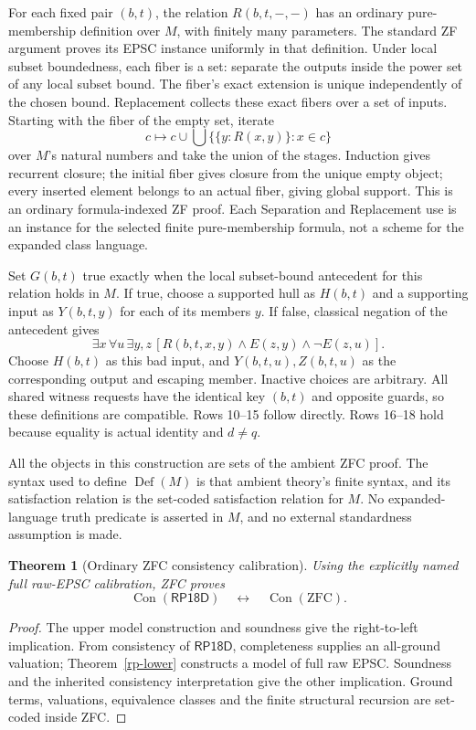 \documentclass[11pt]{article}
\newtheorem{theorem}{Theorem}[section]
\newcommand{\Con}{\operatorname{Con}}
\newcommand{\RP}{\mathsf{RP18D}}
\begin{document}
For each fixed pair $(b,t)$, the relation $R(b,t,-,-)$ has an ordinary
pure-membership definition over $M$, with finitely many parameters.
The standard ZF argument proves its EPSC instance uniformly in that
definition. Under local subset boundedness, each fiber is a set:
separate the outputs inside the power set of any local subset bound.
The fiber's exact extension is unique independently of the chosen bound.
Replacement collects these exact fibers over a set of inputs. Starting
with the fiber of the empty set, iterate
\[
 c\longmapsto c\cup\bigcup\{\{y:R(x,y)\}:x\in c\}
\]
over $M$'s natural numbers and take the union of the stages. Induction
gives recurrent closure; the initial fiber gives closure from the unique
empty object; every inserted element belongs to an actual fiber, giving
global support. This is an ordinary formula-indexed ZF proof. Each
Separation and Replacement use is an instance for the selected finite
pure-membership formula, not a scheme for the expanded class language.

Set $G(b,t)$ true exactly when the local subset-bound antecedent for
this relation holds in $M$. If true, choose a supported hull as $H(b,t)$
and a supporting input as $Y(b,t,y)$ for each of its members $y$.
If false, classical negation of the antecedent gives
\[
 \exists x\,\forall u\,\exists y,z\,
       [R(b,t,x,y)\land E(z,y)\land\neg E(z,u)].
\]
Choose $H(b,t)$ as this bad input, and $Y(b,t,u),Z(b,t,u)$ as the
corresponding output and escaping member. Inactive choices are arbitrary.
All shared witness requests have the identical key $(b,t)$ and opposite
guards, so these definitions are compatible. Rows 10--15 follow directly.
Rows 16--18 hold because equality is actual identity and $d\ne q$.

All the objects in this construction are sets of the ambient ZFC proof.
The syntax used to define $\operatorname{Def}(M)$ is that ambient
theory's finite syntax, and its satisfaction relation is the set-coded
satisfaction relation for $M$. No expanded-language truth predicate is
asserted in $M$, and no external standardness assumption is made.

\begin{theorem}[Ordinary ZFC consistency calibration]\label{rp-main}
Using the explicitly named full raw-EPSC calibration, ZFC proves
\[
 \Con(\RP)\quad\longleftrightarrow\quad\Con(\mathrm{ZFC}).
\]
\end{theorem}
\begin{proof}
The upper model construction and soundness give the right-to-left
implication. From consistency of $\RP$, completeness supplies an
all-ground valuation; Theorem~\ref{rp-lower} constructs a model of
full raw EPSC. Soundness and the inherited consistency interpretation
give the other implication. Ground terms, valuations, equivalence
classes and the finite structural recursion are set-coded inside ZFC.
\end{proof}
\end{document}
